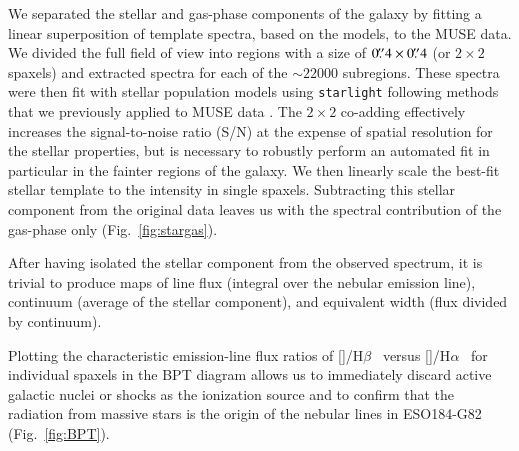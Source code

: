 \documentclass[traditabstract]{aa}
\newcommand{\farc}{\hbox{$.\!\!^{\prime\prime}$}}
\newcommand{\hb}{H$\beta$}
\newcommand{\ha}{H$\alpha$}
\newcommand{\oiii}{[\ion{O}{iii}]}
\newcommand{\nii}{[\ion{N}{ii}]}
\begin{document}
We separated the stellar and gas-phase components of the galaxy by fitting a linear superposition of template spectra, based on the \citet{2003MNRAS.344.1000B} models, to the MUSE data. We divided the full field of view into regions with a size of $0\farc{4}\times0\farc{4}$ (or $2 \times 2$ spaxels) and extracted spectra for each of the $\sim22000$ subregions. These spectra were then fit with stellar population models using \texttt{starlight} \citep{2005MNRAS.358..363C, 2009RMxAC..35..127C} following methods that we previously applied to MUSE data \citep{2016MNRAS.455.4087G, 2016arXiv160703446K, 2016arXiv160900013P}. The $2\times2$ co-adding effectively increases the signal-to-noise ratio (S/N) at the expense of spatial resolution for the stellar properties, but is necessary to robustly perform an automated fit in particular in the fainter regions of the galaxy. We then linearly scale the best-fit stellar template to the intensity in single spaxels. Subtracting this stellar component from the original data leaves us with the spectral contribution of the gas-phase only (Fig.~\ref{fig:stargas}).

After having isolated the stellar component from the observed spectrum, it is trivial to produce maps of line flux (integral over the nebular emission line), continuum (average of the stellar component), and equivalent width (flux divided by continuum). 

Plotting the characteristic emission-line flux ratios of \oiii/\hb~ versus \nii/\ha~ for individual spaxels in the BPT diagram \citep{1981PASP...93....5B} allows us to immediately discard active galactic nuclei or shocks as the ionization source and to confirm that the radiation from massive stars is the origin of the nebular lines in ESO184-G82 (Fig.~\ref{fig:BPT}).
\end{document}

